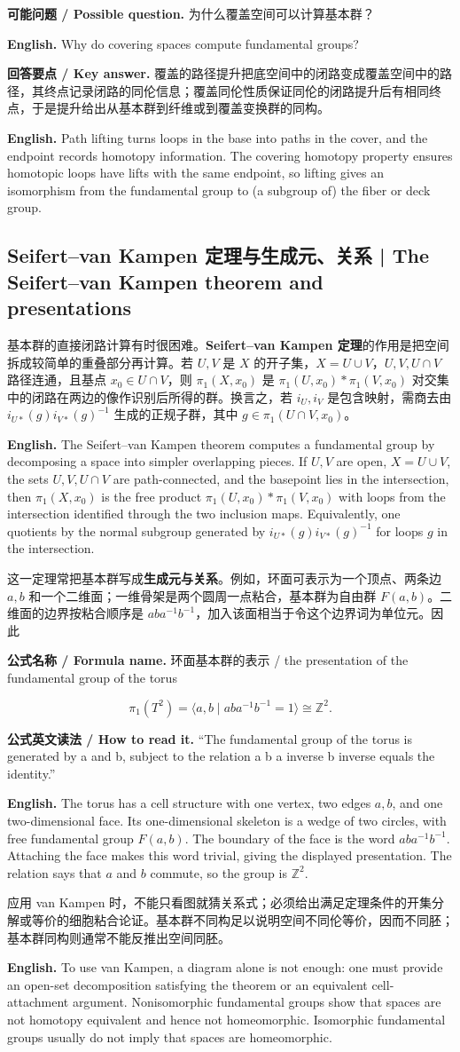 \documentclass[UTF8,11pt,a4paper]{ctexart}
\newcommand{\EN}[1]{\par\noindent\textbf{English.} #1\par}
\newcommand{\READ}[1]{\par\noindent\textbf{公式英文读法 / How to read it.} #1\par}
\newcommand{\FORMULA}[2]{\par\noindent\textbf{公式名称 / Formula name.} #1 / #2\par}
\newcommand{\ASK}[4]{\par\noindent\textbf{可能问题 / Possible question.} #1\par\EN{#2}\noindent\textbf{回答要点 / Key answer.} #3\par\EN{#4}\medskip}
\begin{document}
\ASK{为什么覆盖空间可以计算基本群？}{Why do covering spaces compute fundamental groups?}{覆盖的路径提升把底空间中的闭路变成覆盖空间中的路径，其终点记录闭路的同伦信息；覆盖同伦性质保证同伦的闭路提升后有相同终点，于是提升给出从基本群到纤维或到覆盖变换群的同构。}{Path lifting turns loops in the base into paths in the cover, and the endpoint records homotopy information. The covering homotopy property ensures homotopic loops have lifts with the same endpoint, so lifting gives an isomorphism from the fundamental group to (a subgroup of) the fiber or deck group.}

\subsection{Seifert--van Kampen 定理与生成元、关系 | The Seifert--van Kampen theorem and presentations}
\noindent 基本群的直接闭路计算有时很困难。\textbf{Seifert--van Kampen 定理}的作用是把空间拆成较简单的重叠部分再计算。若 $U,V$ 是 $X$ 的开子集，$X=U\cup V$，$U,V,U\cap V$ 路径连通，且基点 $x_0\in U\cap V$，则 $\pi_1(X,x_0)$ 是 $\pi_1(U,x_0)*\pi_1(V,x_0)$ 对交集中的闭路在两边的像作识别后所得的群。换言之，若 $i_U,i_V$ 是包含映射，需商去由 $i_{U*}(g)i_{V*}(g)^{-1}$ 生成的正规子群，其中 $g\in\pi_1(U\cap V,x_0)$。
\EN{The Seifert--van Kampen theorem computes a fundamental group by decomposing a space into simpler overlapping pieces. If $U,V$ are open, $X=U\cup V$, the sets $U,V,U\cap V$ are path-connected, and the basepoint lies in the intersection, then $\pi_1(X,x_0)$ is the free product $\pi_1(U,x_0)*\pi_1(V,x_0)$ with loops from the intersection identified through the two inclusion maps. Equivalently, one quotients by the normal subgroup generated by $i_{U*}(g)i_{V*}(g)^{-1}$ for loops $g$ in the intersection.}
\noindent 这一定理常把基本群写成\textbf{生成元与关系}。例如，环面可表示为一个顶点、两条边 $a,b$ 和一个二维面；一维骨架是两个圆周一点粘合，基本群为自由群 $F(a,b)$。二维面的边界按粘合顺序是 $aba^{-1}b^{-1}$，加入该面相当于令这个边界词为单位元。因此
\FORMULA{环面基本群的表示}{the presentation of the fundamental group of the torus}
\[
\pi_1(T^2)=\langle a,b\mid aba^{-1}b^{-1}=1\rangle\cong\mathbb Z^2.
\]
\READ{“The fundamental group of the torus is generated by a and b, subject to the relation a b a inverse b inverse equals the identity.”}
\EN{The torus has a cell structure with one vertex, two edges $a,b$, and one two-dimensional face. Its one-dimensional skeleton is a wedge of two circles, with free fundamental group $F(a,b)$. The boundary of the face is the word $aba^{-1}b^{-1}$. Attaching the face makes this word trivial, giving the displayed presentation. The relation says that $a$ and $b$ commute, so the group is $\mathbb Z^2$.}
\noindent 应用 van Kampen 时，不能只看图就猜关系式；必须给出满足定理条件的开集分解或等价的细胞粘合论证。基本群不同构足以说明空间不同伦等价，因而不同胚；基本群同构则通常不能反推出空间同胚。
\EN{To use van Kampen, a diagram alone is not enough: one must provide an open-set decomposition satisfying the theorem or an equivalent cell-attachment argument. Nonisomorphic fundamental groups show that spaces are not homotopy equivalent and hence not homeomorphic. Isomorphic fundamental groups usually do not imply that spaces are homeomorphic.}
\end{document}
